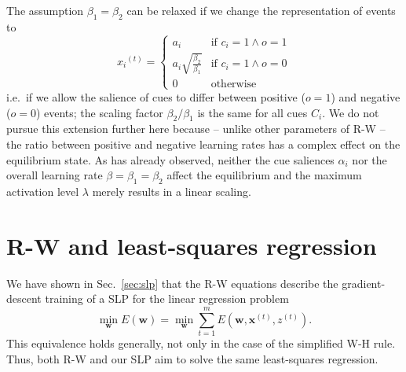 \documentclass[conference]{IEEEtran}
\newcommand{\psup}[1]{\ensuremath{^{(#1)}}}
\newcommand{\psupt}{\psup{t}}
\begin{document}
The assumption $\beta_1 = \beta_2$ can be relaxed if we change the representation of events to
\begin{equation}
  \label{eq:def-x-mod}
  x_i\psupt = 
  \begin{cases}
    a_i & \text{if } c_i = 1 \wedge o = 1 \\
    a_i \sqrt{\frac{\beta_2}{\beta_1}} & \text{if } c_i = 1 \wedge o = 0 \\
    0 & \text{otherwise}
  \end{cases}
\end{equation}
i.e.\ if we allow the salience of cues to differ between positive ($o = 1$) and negative ($o = 0$) events; the scaling factor $\beta_2 / \beta_1$ is the same for all cues $C_i$.  We do not pursue this extension further here because -- unlike other parameters of R-W -- the ratio between positive and negative learning rates has a complex effect on the equilibrium state.  As \cite{danks2003} has already observed, neither the cue saliences $\alpha_i$ nor the overall learning rate $\beta = \beta_1 = \beta_2$ affect the equilibrium and the maximum activation level $\lambda$ merely results in a linear scaling. 

\section{R-W and least-squares regression}
\label{sec:regression}

We have shown in Sec.~\ref{sec:slp} that the R-W equations describe the gradient-descent training of a SLP for the linear regression problem
\begin{equation}
  \label{eq:lsr-def}
  \min_{\mathbf{w}} E(\mathbf{w})
  = \min_{\mathbf{w}} \sum_{t=1}^m E(\mathbf{w}, \mathbf{x}\psupt, z\psupt) .
\end{equation}
This equivalence holds generally, not only in the case of the simplified W-H rule.  Thus, both R-W and our SLP aim to solve the same least-squares regression.
\end{document}
